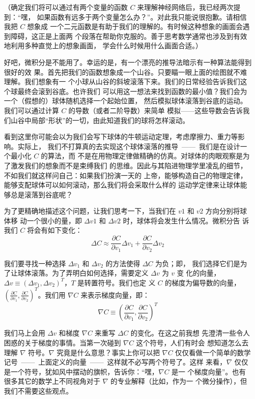 （确定我们将可以通过有两个变量的函数 $C$ 来理解神经网络后，我已经两次提到：“嘿，
  如果函数有远多于两个变量怎么办？”。对此我只能说很抱歉。请相信我把 $C$ 想象成
  一个二元函数是有助于我们的理解的。有时候这种想象的画面会遇到障碍，这正是上面两
  个段落在帮助你克服的。善于思考数学通常也涉及到有效地利用多种直觉上的想象画面，
  学会什么时候用什么画面合适。）

好吧，微积分是不能用了。幸运的是，有一个漂亮的推导法暗示有一种算法能得到很好的效
果。首先把我们的函数想象成一个山谷。只要瞄一眼上面的绘图就不难理解。我们想象有一
个小球从山谷的斜坡滚落下来。我们的日常经验告诉我们这个球最终会滚到谷底。也许我们
可以用这一想法来找到函数的最小值？我们会为一个（假想的）球体随机选择一个起始位置，
然后模拟球体滚落到谷底的运动。我们可以通过计算 $C$ 的导数（或者二阶导数）来简单
模拟——这些导数会告诉我们山谷中局部“形状”的一切，由此知道我们的球将怎样滚动。

看到这里你可能会以为我们会写下球体的牛顿运动定理，考虑摩擦力、重力等影响。实际上，
我们不打算真的去实现这个球体滚落的推导~——~我们是在设计一个最小化 $C$ 的算法，而
不是在用物理定律做精确的仿真。对球体的肉眼观察是为了激发我们的想象而不是束缚我们
的思维。因此与其陷进物理学里凌乱的细节，不如我们就这样问自己：如果我们扮演一天的
上帝，能够构造自己的物理定律，能够支配球体可以如何滚动，那么我们将会采取什么样的
运动学定律来让球体能够总是滚落到谷底呢？

为了更精确地描述这个问题，让我们思考一下，当我们在 $v1$ 和 $v2$ 方向分别将球体移
动一个很小的量，即 $\Delta v1$ 和 $\Delta v2$ 时，球体将会发生什么情况。微积分告
诉我们 $C$ 将会有如下变化：
\begin{equation}
  \Delta C \approx \frac{\partial C}{\partial v_1} \Delta v_1 +
  \frac{\partial C}{\partial v_2} \Delta v_2
  \label{eq:7}\tag{7}
\end{equation}

我们要寻找一种选择 $\Delta v_1$ 和 $\Delta v_2$ 的方法使得 $\Delta C$ 为负；即，
我们选择它们是为了让球体滚落。为了弄明白如何选择，需要定义 $\Delta v$ 为 $v$ 变
化的向量，$\Delta v \equiv (\Delta v_1, \Delta v_2)^T$，$T$ 是转置符号。我们也定
义 $C$ 的梯度为偏导数的向量，$\left(\frac{\partial C}{\partial v_1},
\frac{\partial C}{\partial v_2}\right)^T$。我们用 $\nabla C$ 来表示梯度向量，即：
\begin{equation}
  \nabla C \equiv \left( \frac{\partial C}{\partial v_1}, \frac{\partial
      C}{\partial v_2} \right)^T
  \label{eq:8}\tag{8}
\end{equation}

我们马上会用 $\Delta v$ 和梯度 $\nabla C$ 来重写 $\Delta C$ 的变化。在这之前我想
先澄清一些令人困惑的关于梯度的事情。当第一次碰到 $\nabla C$ 这个符号，人们有时会
想知道怎么去理解 $\nabla$ 符号。$\nabla$ 究竟是什么意思？事实上你可以把 $\nabla
C$ 仅仅看做一个简单的数学记号~——~上面定义的向量~——~这样就不必写两个符号了。这样
来看，$\nabla$ 仅仅是一个符号，犹如风中摆动的旗帜，告诉你：“嘿，$\nabla C$ 是一
个梯度向量”。也有很多其它的数学上不同视角对于 $\nabla$ 的专业解释（比如，作为一
  个微分操作），但我们不需要这些观点。

